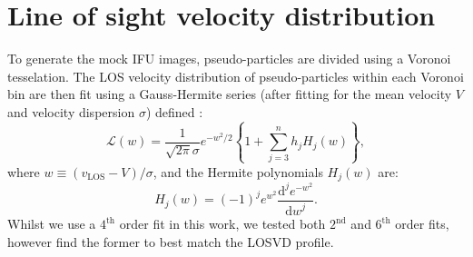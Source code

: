 \documentclass[twocolumn]{aastex631}
\newcommand{\dd}[1]{\ensuremath{\mathrm{d}#1}}                %
\newcommand{\dnv}[3]{\ensuremath{\frac{\mathrm{d}^#1#2}{\dd{#3}^#1}}}  %
\newcommand{\ordinal}[1]{\ensuremath{#1^\mathrm{th}}}         %
\begin{document}
\section{Line of sight velocity distribution}\label{sec:app_losvd}
To generate the mock IFU images, pseudo-particles are divided using a Voronoi tesselation.
The LOS velocity distribution of pseudo-particles within each Voronoi bin are then fit using a Gauss-Hermite series (after fitting for the mean velocity $V$ and velocity dispersion $\sigma$) defined \citep{vandermarel1993}:
\begin{equation}
    \mathscr{L}(w) = \frac{1}{\sqrt{2\pi}\sigma} e^{-w^2/2} \left\{ 1 + \sum_{j=3}^n h_j H_j(w) \right\},
\end{equation}
where $w \equiv (v_\mathrm{LOS} - V)/\sigma$, and the Hermite polynomials $H_j(w)$ are:
\begin{equation}
    H_j(w) = (-1)^j e^{w^2} \dnv{j}{e^{-w^2}}{w}.
\end{equation}
Whilst we use a \ordinal{4} order fit in this work, we tested both $2^\mathrm{nd}$ and \ordinal{6} order fits, however find the former to best match the LOSVD profile.


{}



\end{document}
